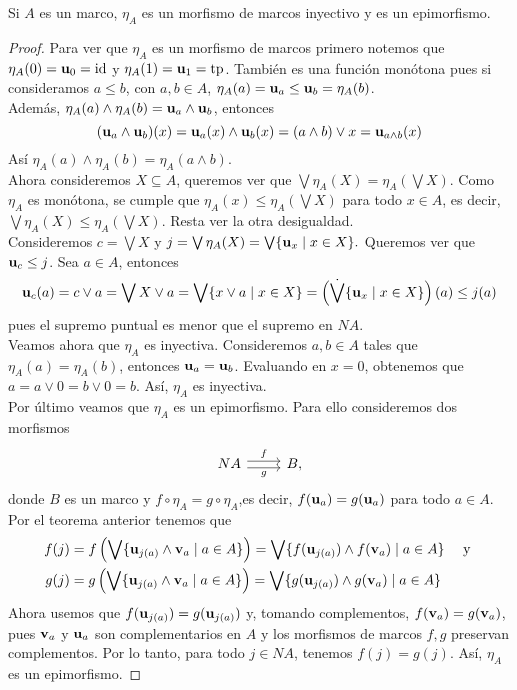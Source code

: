 \begin{thm}
  Si $A$ es un marco, $\eta_A$ es un morfismo de marcos inyectivo
  y es un epimorfismo.
\end{thm}
\begin{proof}
Para ver que $\eta_A$ es un morfismo de marcos primero notemos que $\eta_A(0)=\mathbf u_{0}=\mathrm{id}$ y $\eta_A(1)=\mathbf u_{1}=\mathrm{tp}$. También es una función monótona pues si consideramos $a\leq b$, con $a,b\in A$, $\eta_A(a)=\mathbf u_{a}\leq \mathbf u_{b}=\eta_A(b)$.\\
Además, $\eta_A(a)\wedge\eta_A(b)=\mathbf u_{a}\wedge \mathbf u_{b}$, entonces $$(\mathbf u_{a}\wedge \mathbf u_{b})(x)=\mathbf u_{a}(x)\wedge \mathbf u_{b}(x)=(a\wedge b)\vee x=\mathbf u_{a\wedge b}(x)$$
Así $\eta_A(a)\wedge \eta_A(b)=\eta_A(a\wedge b).$\\
Ahora consideremos $X\subseteq A$, queremos ver que $\bigvee\eta_A(X)=\eta_A(\bigvee X)$. Como $\eta_A$ es monótona, se cumple que $\eta_A(x)\leq \eta_A(\bigvee X)$ para todo $x\in A$, es decir, $\bigvee\eta_A (X)\leq \eta_A(\bigvee X).$ Resta ver la otra desigualdad.\\
Consideremos $c=\bigvee X$ y $j=\bigvee \eta_A(X)=\bigvee\{ \mathbf u_{x}\mid x\in X\}.$ Queremos ver que $\mathbf u_{c}\leq j$. Sea $a\in A$, entonces $$\mathbf u_{c}(a)=c\vee a=\bigvee X\vee a=\bigvee\{x\vee a\mid x\in X\}=\left(\dot{\bigvee}\{\mathbf u_{x}\mid x\in X\}\right)(a)\leq j(a)$$
pues el supremo puntual es menor que el supremo en $NA.$\\
Veamos ahora que $\eta_A$ es inyectiva. Consideremos $a,b\in A$ tales que $\eta_A(a)=\eta_A(b)$, entonces $\mathbf u_{a}=\mathbf u_{b}$. Evaluando en $x=0$, obtenemos que $a=a\vee 0=b\vee 0=b$. Así, $\eta_A$ es inyectiva.\\
Por último veamos que $\eta_A$ es un epimorfismo. Para ello consideremos dos morfismos 
\[\begin{tikzcd}
	{NA} \ar[r,"f",shift left] \ar[r,"g"',shift right] & {B},
\end{tikzcd}\]
donde $B$ es un marco y $f\circ\eta_A=g\circ\eta_A$,es decir, $f(\mathbf u_{a})=g(\mathbf u_{a})$ para todo $a\in A$. Por el teorema anterior tenemos que 
\begin{align*}
    f(j)
    &= f\left(\bigvee\{\mathbf u_{j(a)}\wedge \mathbf v_{a}\mid a\in A\}\right)
    =\bigvee\{f(\mathbf u_{j(a)})\wedge f(\mathbf v_{a})\mid a\in A\} & \mbox{ y } \\
    g(j)
    &= g\left(\bigvee\{\mathbf u_{j(a)}\wedge \mathbf v_{a}\mid a\in A\}\right)
    = \bigvee\{g(\mathbf u_{j(a)})\wedge g(\mathbf v_{a})\mid a\in A\} & 
\end{align*}
Ahora usemos que $f(\mathbf u_{j(a)})=g(\mathbf u_{j(a)})$ y,
tomando complementos, $f(\mathbf v_{a})=g(\mathbf v_{a})$, pues $\mathbf v_{a}$ y $\mathbf u_{a}$
son complementarios en $A$ y los morfismos de marcos $f,g$
preservan complementos.
Por lo tanto, para todo $j\in NA$, tenemos $f(j)=g(j)$.
Así, $\eta_A$ es un epimorfismo.
\end{proof}

